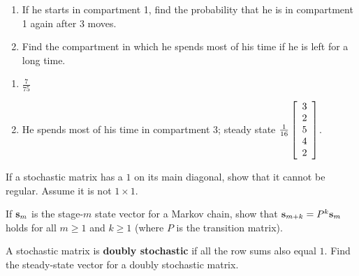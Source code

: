 \begin{multicols}{2}
\begin{ex}
\begin{figure}[H]
\centering

\end{figure}

\begin{enumerate}[label={\alph*.}]
\item If he starts in compartment 1, find the probability that he is in compartment 1 again after $3$ moves.

\item Find the compartment in which he spends most of his time if he is left for a long time.

\end{enumerate}
\begin{sol}
\begin{enumerate}[label={\alph*.}]
\item $\frac{7}{75}$

\item  He spends most of his time in compartment 3; steady state $\tfrac{1}{16} \left[ \begin{array}{r}
3 \\
2 \\
5 \\
4 \\
2
\end{array} \right]$.

\end{enumerate}
\end{sol}
\end{ex}

\columnbreak
\begin{ex}
If a stochastic matrix has a $1$ on its main diagonal, show that it cannot be regular. Assume it is not $1 \times 1$.
\end{ex}

\begin{ex}
If $\textbf{s}_{m}$ is the stage-$m$ state vector for a Markov chain, show that $\textbf{s}_{m+k} = P^{k}\textbf{s}_{m}$ holds for all $m \geq 1$ and $k \geq 1$ (where $P$ is the transition matrix).
\end{ex}

\begin{ex}
A stochastic matrix is \textbf{doubly stochastic} if all the row sums also equal $1$. Find the steady-state vector for a doubly stochastic matrix.
\end{ex}


\end{multicols}

